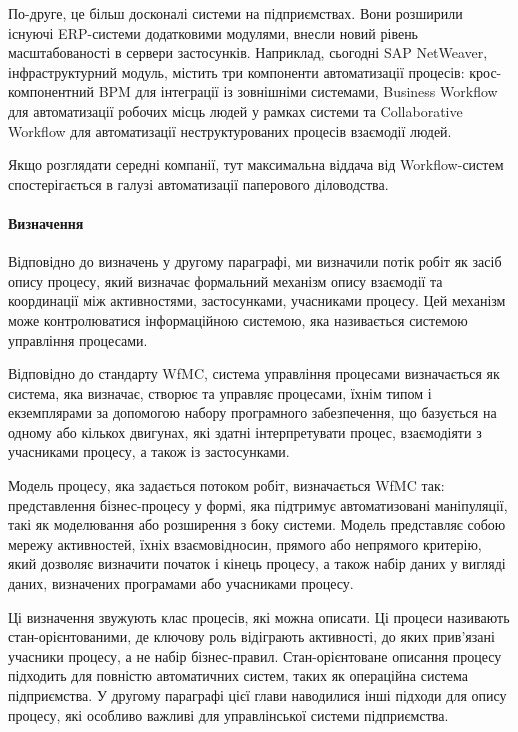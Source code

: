 \documentclass{memoir}
\begin{document}
По-друге, це більш досконалі системи на підприємствах. Вони розширили існуючі ERP-системи додатковими модулями, внесли новий рівень масштабованості в сервери застосунків. Наприклад, сьогодні SAP NetWeaver, інфраструктурний модуль, містить три компоненти автоматизації процесів: крос-компонентний BPM для інтеграції із зовнішніми системами, Business Workflow для автоматизації робочих місць людей у рамках системи та Collaborative Workflow для автоматизації неструктурованих процесів взаємодії людей.

Якщо розглядати середні компанії, тут максимальна віддача від Workflow-систем спостерігається в галузі автоматизації паперового діловодства.

\paragraph{Визначення}

Відповідно до визначень у другому параграфі, ми визначили потік робіт як засіб опису процесу, який визначає формальний механізм опису взаємодії та координації між активностями, застосунками, учасниками процесу. Цей механізм може контролюватися інформаційною системою, яка називається системою управління процесами.

Відповідно до стандарту WfMC, система управління процесами визначається як система, яка визначає, створює та управляє процесами, їхнім типом і екземплярами за допомогою набору програмного забезпечення, що базується на одному або кількох двигунах, які здатні інтерпретувати процес, взаємодіяти з учасниками процесу, а також із застосунками.

Модель процесу, яка задається потоком робіт, визначається WfMC так: представлення бізнес-процесу у формі, яка підтримує автоматизовані маніпуляції, такі як моделювання або розширення з боку системи. Модель представляє собою мережу активностей, їхніх взаємовідносин, прямого або непрямого критерію, який дозволяє визначити початок і кінець процесу, а також набір даних у вигляді даних, визначених програмами або учасниками процесу.

Ці визначення звужують клас процесів, які можна описати. Ці процеси називають стан-орієнтованими, де ключову роль відіграють активності, до яких прив’язані учасники процесу, а не набір бізнес-правил. Стан-орієнтоване описання процесу підходить для повністю автоматичних систем, таких як операційна система підприємства. У другому параграфі цієї глави наводилися інші підходи для опису процесу, які особливо важливі для управлінської системи підприємства.
\end{document}
